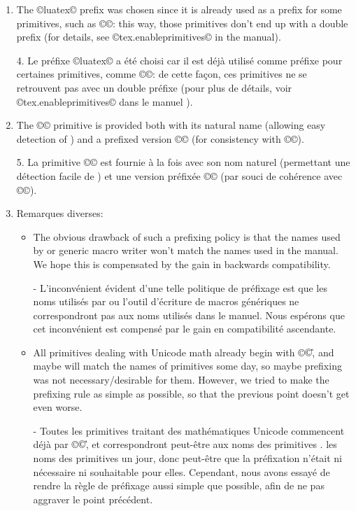 \documentclass{lltxdoc}
\begin{document}
\begin{myquote}
\begin{enumerate}
    \item The ©luatex© prefix was chosen since it is already used as a prefix
      for some primitives, such as ©\luatexversion©: this way, those
      primitives don't end up with a double prefix (for details, see
      ©tex.enableprimitives© in the \luatex manual).

4. Le préfixe ©luatex© a été choisi car il est déjà utilisé comme préfixe pour certaines primitives, comme ©\luatexversion©: de cette façon, ces primitives ne se retrouvent pas avec un double préfixe (pour plus de détails, voir ©tex.enableprimitives© dans le manuel \luatex).

    \item The ©\directlua© primitive is provided both with its natural name
      (allowing easy detection of \luatex) and a prefixed version
      ©\luatexdirectlua© (for consistency with ©\luatexlatelua©).

5. La primitive ©\directlua© est fournie à la fois avec son nom naturel (permettant une détection facile de \luatex) et une version préfixée ©\luatexdirectlua© (par souci de cohérence avec ©\luatexlatelua©).

    \item Remarques diverses:
      \begin{itemize}
        \item The obvious drawback of such a prefixing policy is that the
          names used by \latex or generic macro writer won't match the names
          used in the manual.  We hope this is compensated by the gain in
          backwards compatibility.

- L'inconvénient évident d'une telle politique de préfixage est que les noms utilisés par \latex ou l'outil d'écriture de macros génériques ne correspondront pas aux noms utilisés dans le manuel. Nous espérons que cet inconvénient est compensé par le gain en compatibilité ascendante.

        \item All primitives dealing with Unicode math already begin with ©\U©,
          and maybe will match the names of \xetex primitives some day, so
          maybe prefixing was not necessary/desirable for them. However, we
          tried to make the prefixing rule as simple as possible, so that
          the previous point doesn't get even worse.

- Toutes les primitives traitant des mathématiques Unicode commencent déjà par ©\U©, et correspondront peut-être aux noms des primitives \xetex. les noms des primitives \xetex un jour, donc peut-être que la préfixation n'était ni nécessaire ni souhaitable pour elles. Cependant, nous avons essayé de rendre la règle de préfixage aussi simple que possible, afin de ne pas aggraver le point précédent.


\end{itemize}
\end{enumerate}
\end{myquote}
\end{document}
